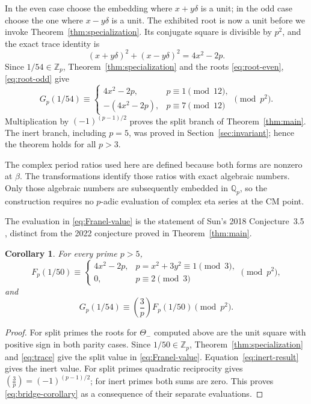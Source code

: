 \documentclass[11pt,a4paper]{article}
\newtheorem{corollary}[theorem]{Corollary}
\theoremstyle{remark}\newtheorem{remark}[theorem]{Remark}
\newcommand{\Z}{\mathbb Z}\newcommand{\Q}{\mathbb Q}
\newcommand{\leg}[2]{\left(\frac{#1}{#2}\right)}
\begin{document}
In the even case choose the embedding where $x+y\delta$ is a unit;
in the odd case choose the one where $x-y\delta$ is a unit.
The exhibited root is now a unit before we invoke
Theorem~\ref{thm:specialization}. Its conjugate square is divisible by
$p^2$, and the exact trace identity is
\begin{equation}\label{eq:trace}
 (x+y\delta)^2+(x-y\delta)^2=4x^2-2p.
\end{equation}
Since $1/54\in\Z_p$, Theorem~\ref{thm:specialization} and the roots
\eqref{eq:root-even}, \eqref{eq:root-odd} give
\begin{equation}\label{eq:split-values}
 G_p(1/54)\equiv
 \begin{cases}
 4x^2-2p,&p\equiv1\pmod{12},\\
 -(4x^2-2p),&p\equiv7\pmod{12}
 \end{cases}\pmod{p^2}.
\end{equation}
Multiplication by $(-1)^{(p-1)/2}$ proves the split branch of
Theorem~\ref{thm:main}. The inert branch, including $p=5$, was proved
in Section~\ref{sec:invariant}; hence the theorem holds for all $p>3$.

The complex period ratios used here are defined because both forms are
nonzero at $\beta$. The transformations identify those ratios with exact
algebraic numbers. Only those algebraic numbers are subsequently embedded
in $\Q_p$, so the construction requires no $p$-adic evaluation of complex
eta series at the CM point.

The evaluation in \eqref{eq:Franel-value} is the statement of
Sun's 2018 Conjecture~3.5 \cite[Conjecture~3.5]{sunfranel}, distinct from
the 2022 conjecture proved in Theorem~\ref{thm:main}.

\begin{corollary}\label{cor:Franel}
For every prime $p>5$,
\begin{equation}\label{eq:Franel-value}
 F_p(1/50)\equiv
 \begin{cases}
 4x^2-2p,&p=x^2+3y^2\equiv1\pmod3,\\
 0,&p\equiv2\pmod3
 \end{cases}\pmod{p^2},
\end{equation}
and
\begin{equation}\label{eq:bridge-corollary}
 G_p(1/54)\equiv\leg3p F_p(1/50)\pmod{p^2}.
\end{equation}
\end{corollary}
\begin{proof}
For split primes the roots for $\Theta_-$ computed above are the unit
square with positive sign in both parity cases. Since $1/50\in\Z_p$,
Theorem~\ref{thm:specialization} and \eqref{eq:trace} give the split value
in \eqref{eq:Franel-value}. Equation~\eqref{eq:inert-result} gives the
inert value. For split primes quadratic reciprocity gives
$\leg3p=(-1)^{(p-1)/2}$; for inert primes both sums are zero.
This proves \eqref{eq:bridge-corollary} as a consequence of their separate
evaluations.
\end{proof}
\end{document}
